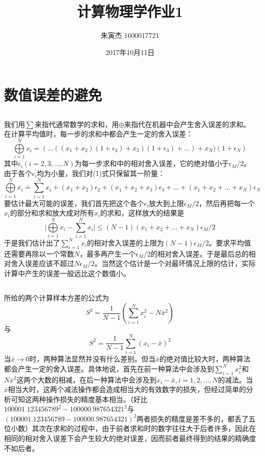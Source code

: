 \documentclass[UTF8]{ctexart}
\title{计算物理学作业1}
\author{朱寅杰 1600017721}
\date{2017年10月11日}
\begin{document}
\maketitle
\section{数值误差的避免}
\subsection{}

我们用$\sum$来指代通常数学的求和，用$\oplus$来指代在机器中会产生舍入误差的求和。在计算平均值时，每一步的求和中都会产生一定的舍入误差：
\begin{equation}
\bigoplus\limits_{i=1}^{N} x_i=(...((x_1+x_2)(1+\epsilon_2)+x_3)(1+\epsilon_3)+...)+x_N)(1+\epsilon_N)
\end{equation}
其中$\epsilon_i(i=2,3,...,N)$为每一步求和中的相对舍入误差，它的绝对值小于$\epsilon_M/2$。由于各个$\epsilon_i$均为小量，我们对(1)式只保留其一阶量：
\begin{equation}
\bigoplus\limits_{i=1}^{N} x_i\doteq \sum\limits_{i=1}^{N}x_i+(x_1+x_2)\epsilon_2 +(x_1+x_2+x_3)\epsilon_3 +...+(x_1+x_2+...+x_N)\epsilon_N
\end{equation}
要估计最大可能的误差，我们首先把这个各个$\epsilon_i$放大到上限$\epsilon_M/2$，然后再把每一个$x_i$的部分和求和放大成对所有$x_i$的求和，这样放大的结果是
\begin{equation}
\lvert \bigoplus\limits_{i=1}^{N} x_i-\sum\limits_{i=1}^{N}x_i \rvert \leq (N-1)(x_1+x_2+...+x_N)\epsilon_M/2
\end{equation}
于是我们估计出了$\sum\limits_{i=1}^{N}x_i$的相对舍入误差的上限为$(N-1)\epsilon_M/2$。要求平均值还需要再除以一个常数$N$，最多再产生一个$\epsilon_M/2$的相对舍入误差。于是最后总的相对舍入误差应该不超过$N\epsilon_M/2$。当然这个估计是一个对最坏情况上限的估计，实际计算中产生的误差一般远比这个数值小。

\subsection{}

所给的两个计算样本方差的公式为
\begin{equation}
S^2=\frac{1}{N-1}(\sum\limits_{i=1}^{N}x_i^2-N\bar{x}^2)
\end{equation}
与
\begin{equation}
S^2=\frac{1}{N-1}\sum\limits_{i=1}^{N}(x_i-\bar{x})^2
\end{equation}
当$\bar{x}\rightarrow0$时，两种算法显然并没有什么差别。但当$\bar{x}$的绝对值比较大时，两种算法都会产生一定的舍入误差。具体地说，首先在前一种算法中会涉及到$\sum\limits_{i=1}^{N}x_i^2$和$N\bar{x}^2$这两个大数的相减，在后一种算法中会涉及到$x_i-\bar{x},i=1,2,...,N$的减法。当$\bar{x}$相当大时，这两个减法操作都会造成相当大的有效数字的损失，但经过简单的分析可知这两种操作损失的精度基本相当。（好比$100001.123456789^2-100000.987654321^2$与$(100001.123456789-100000.987654321)^2$两者损失的精度是差不多的，都丢了五位小数）其次在求和的过程中，由于前者求和时的数字往往大于后者许多，因此在相同的相对舍入误差下会产生较大的绝对误差，因而前者最终得到的结果的精确度不如后者。
\end{document}
